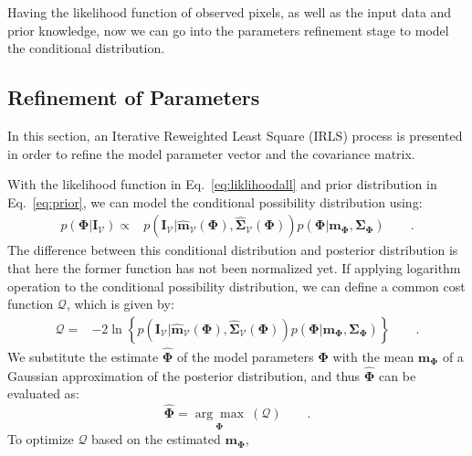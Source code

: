 \documentclass[conference]{IEEEtran}
\begin{document}
Having the likelihood function of observed pixels, as well as
the input data and prior knowledge, now we can go into the parameters
refinement stage to model the conditional distribution.

\subsection{Refinement of  Parameters}
\label{sec:ref}
In this section, an Iterative Reweighted Least Square (IRLS) process
is presented in order to refine the model parameter vector and the covariance matrix.

With the likelihood function in Eq.~\ref{eq:liklihoodall} and prior distribution in
Eq.~\ref{eq:prior}, we can model the conditional possibility distribution using:
\begin{align}
\label{eq:costf}
    p(\mathbf{\Phi}|\mathbf{\mathbf{I}}_{\mathcal{V}}) 
    \propto &
    p(\mathbf{\mathbf{I}_{\mathcal{V}}}
    |\hat{\mathbf{\mathbf{m}}}_{\mathcal{V}}(\mathbf{\Phi}),\hat{\mathbf{\mathbf{\Sigma}}}_{\mathcal{V}}(\mathbf{\Phi}))p(\mathbf{\Phi}
    | \mathbf{m}_{\mathbf{\Phi}},
    \mathbf{\mathbf{\Sigma}}_{\mathbf{\Phi}})\qquad.
\end{align}
The difference between this conditional distribution and posterior
distribution is that here the former function has not been normalized yet.
If applying logarithm operation to the conditional possibility
distribution, we can define a common cost function $\mathcal{Q}$,
which is given by:
\begin{align}
  \label{eq:costd}
  \mathcal{Q} = & -2 \ln \left\{  p(\mathbf{\mathbf{I}_{\mathcal{V}}}
    |\hat{\mathbf{\mathbf{m}}}_{\mathcal{V}}(\mathbf{\Phi}),\hat{\mathbf{\mathbf{\Sigma}}}_{\mathcal{V}}(\mathbf{\Phi}))p(\mathbf{\Phi}
    | \mathbf{m}_{\mathbf{\Phi}},
    \mathbf{\mathbf{\Sigma}}_{\mathbf{\Phi}})\right\}\qquad.
\end{align}
We substitute the estimate $\hat{\mathbf{\Phi}}$ of the model
parameters $\mathbf{\Phi}$ with the mean $\mathbf{m}_{\mathbf{\Phi}}$ of a Gaussian
approximation of the posterior distribution, and thus
$\hat{\mathbf{\Phi}}$ can be evaluated as:
\begin{equation}
  \label{eq:maxcost}
  \hat{\mathbf{\Phi}} =
  \underset{\mathbf{\Phi}}{\arg\max} \
  (\mathcal{Q}) \qquad.
\end{equation}
To optimize $\mathcal{Q}$ based on the estimated $\mathbf{m}_{\mathbf{\Phi}}$,
\end{document}
